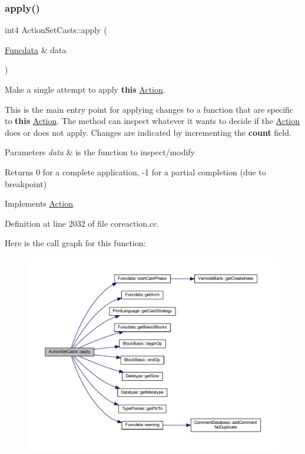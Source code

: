 \subsubsection{\texorpdfstring{apply()}{apply()}}
{\footnotesize\ttfamily int4 Action\+Set\+Casts\+::apply (\begin{DoxyParamCaption}\item[{\mbox{\hyperlink{class_funcdata}{Funcdata}} \&}]{data }\end{DoxyParamCaption})\hspace{0.3cm}{\ttfamily [virtual]}}



Make a single attempt to apply {\bfseries{this}} \mbox{\hyperlink{class_action}{Action}}. 

This is the main entry point for applying changes to a function that are specific to {\bfseries{this}} \mbox{\hyperlink{class_action}{Action}}. The method can inspect whatever it wants to decide if the \mbox{\hyperlink{class_action}{Action}} does or does not apply. Changes are indicated by incrementing the {\bfseries{count}} field. 
\begin{DoxyParams}{Parameters}
{\em data} & is the function to inspect/modify \\
\hline
\end{DoxyParams}
\begin{DoxyReturn}{Returns}
0 for a complete application, -\/1 for a partial completion (due to breakpoint) 
\end{DoxyReturn}


Implements \mbox{\hyperlink{class_action_aac1c3999d6c685b15f5d9765a4d04173}{Action}}.



Definition at line 2032 of file coreaction.\+cc.

Here is the call graph for this function\+:
\nopagebreak
\begin{figure}[H]
\begin{center}
\leavevmode
\includegraphics[width=350pt]{class_action_set_casts_a9999706f3347f707e39c28b5a208fbd3_cgraph}
\end{center}
\end{figure}
\mbox{\label{class_action_set_casts_abd5deebdb942e64993d2f321b4c1901e}} 
